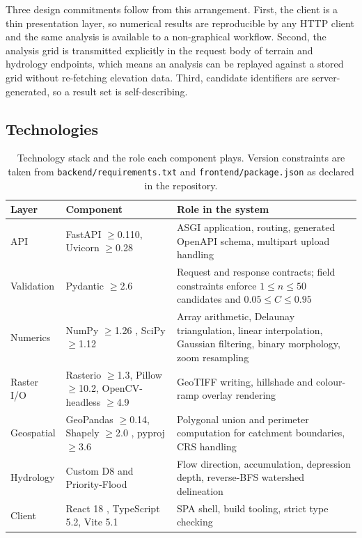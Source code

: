 \documentclass[sigconf,review,10pt]{acmart}
\newcommand{\cb}{\allowbreak}
\newcommand{\codelong}[1]{\texttt{#1}}
\begin{document}
Three design commitments follow from this arrangement. First, the client is
a thin presentation layer, so numerical results are reproducible by any
HTTP client and the same analysis is available to a non-graphical
workflow. Second, the analysis grid is transmitted explicitly in the
request body of terrain and hydrology endpoints, which means an analysis
can be replayed against a stored grid without re-fetching elevation data.
Third, candidate identifiers are server-generated, so a result set is
self-describing.

\subsection{Technologies}

\begin{table}[t]
\caption{Technology stack and the role each component plays. Version
constraints are taken from \codelong{backend/\cb{}requirements.\cb{}txt} and
\codelong{frontend/\cb{}package.\cb{}json} as declared in the repository.}
\label{tab:tech}
\small
\begin{tabular}{@{}R{2.5cm}R{4.0cm}R{10.0cm}@{}}
\toprule
\textbf{Layer} & \textbf{Component} & \textbf{Role in the system} \\
\midrule
API & FastAPI $\ge$0.110, Uvicorn $\ge$0.28 \cite{fastapi} & ASGI application, routing, generated OpenAPI schema, multipart upload handling \\
Validation & Pydantic $\ge$2.6 \cite{fastapi} & Request and response contracts; field constraints enforce $1\leq n \leq 50$ candidates and $0.05\leq C\leq 0.95$ \\
Numerics & NumPy $\ge$1.26 \cite{numpy2020}, SciPy $\ge$1.12 \cite{scipy} & Array arithmetic, Delaunay triangulation, linear interpolation, Gaussian filtering, binary morphology, zoom resampling \\
Raster I/O & Rasterio $\ge$1.3, Pillow $\ge$10.2, OpenCV-headless $\ge$4.9 & GeoTIFF writing, hillshade and colour-ramp overlay rendering \\
Geospatial & GeoPandas $\ge$0.14, Shapely $\ge$2.0 \cite{shapely}, pyproj $\ge$3.6 & Polygonal union and perimeter computation for catchment boundaries, CRS handling \\
Hydrology & Custom D8 and Priority-Flood \cite{ocallaghan1984,barnes2014} & Flow direction, accumulation, depression depth, reverse-BFS watershed delineation \\
Client & React 18 \cite{react}, TypeScript 5.2, Vite 5.1 & SPA shell, build tooling, strict type checking \\

\end{tabular}
\end{table}
\end{document}
